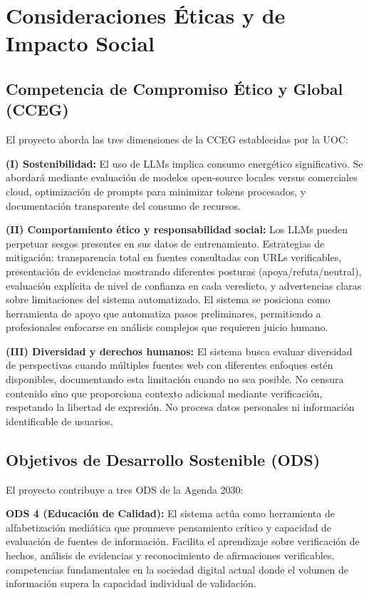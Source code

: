 \documentclass[12pt,a4paper]{article}
\begin{document}
\section{Consideraciones Éticas y de Impacto Social}

\subsection{Competencia de Compromiso Ético y Global (CCEG)}

El proyecto aborda las tres dimensiones de la CCEG establecidas por la UOC:

\textbf{(I) Sostenibilidad:} El uso de LLMs implica consumo energético significativo. Se abordará mediante evaluación de modelos open-source locales versus comerciales cloud, optimización de prompts para minimizar tokens procesados, y documentación transparente del consumo de recursos.

\textbf{(II) Comportamiento ético y responsabilidad social:} Los LLMs pueden perpetuar sesgos presentes en sus datos de entrenamiento. Estrategias de mitigación: transparencia total en fuentes consultadas con URLs verificables, presentación de evidencias mostrando diferentes posturas (apoya/refuta/neutral), evaluación explícita de nivel de confianza en cada veredicto, y advertencias claras sobre limitaciones del sistema automatizado. El sistema se posiciona como herramienta de apoyo que automatiza pasos preliminares, permitiendo a profesionales enfocarse en análisis complejos que requieren juicio humano.

\textbf{(III) Diversidad y derechos humanos:} El sistema busca evaluar diversidad de perspectivas cuando múltiples fuentes web con diferentes enfoques estén disponibles, documentando esta limitación cuando no sea posible. No censura contenido sino que proporciona contexto adicional mediante verificación, respetando la libertad de expresión. No procesa datos personales ni información identificable de usuarios.

\subsection{Objetivos de Desarrollo Sostenible (ODS)}

El proyecto contribuye a tres ODS de la Agenda 2030:

\textbf{ODS 4 (Educación de Calidad):} El sistema actúa como herramienta de alfabetización mediática que promueve pensamiento crítico y capacidad de evaluación de fuentes de información. Facilita el aprendizaje sobre verificación de hechos, análisis de evidencias y reconocimiento de afirmaciones verificables, competencias fundamentales en la sociedad digital actual donde el volumen de información supera la capacidad individual de validación.
\end{document}
